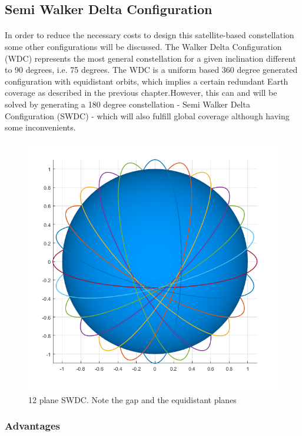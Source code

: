 \subsection{Semi Walker Delta Configuration}
\paragraph{ }

In order to reduce the necessary costs to design this satellite-based constellation some other configurations will be discussed. The Walker Delta Configuration (WDC) represents the most general constellation for a given inclination different to 90 degrees, i.e. 75 degrees. The WDC is a uniform based 360 degree generated configuration with equidistant orbits, which implies a certain redundant Earth coverage as described in the previous chapter.However, this can and will be solved by generating a 180 degree constellation - Semi Walker Delta Configuration (SWDC) - which will also fulfill global coverage although having some inconvenients. 

\begin{figure}[h]
\includegraphics[width=12cm]{semiwalker12vertical}
\centering
\caption{12 plane SWDC. Note the gap and the equidistant planes}
\end{figure}

\subsubsection{Advantages}\vfill

